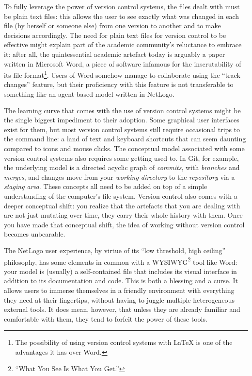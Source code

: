\documentclass[runningheads]{llncs}
\begin{document}
To fully leverage the power of version control systems, the files dealt with must be plain text files: this allows the user to see exactly what was changed in each file (by herself or someone else) from one version to another and to make decisions accordingly. The need for plain text files for version control to be effective might explain part of the academic community's reluctance to embrace it: after all, the quintessential academic artefact today is arguably a paper written in Microsoft Word, a piece of software infamous for the inscrutability of its file format\footnote{The possibility of using version control systems with \LaTeX{} is one of the advantages it has over Word.}. Users of Word somehow manage to collaborate using the ``track changes'' feature, but their proficiency with this feature is not transferable to something like an agent-based model written in NetLogo.

The learning curve that comes with the use of version control systems might be the single biggest impediment to their adoption. Some graphical user interfaces exist for them, but most version control systems still require occasional trips to the command line: a land of text and keyboard shortcuts that can seem daunting compared to icons and mouse clicks. The conceptual model associated with some version control systems also requires some getting used to. In Git, for example, the underlying model is a directed acyclic graph of \emph{commits}, with \emph{branches} and \emph{merges}, and changes move from your \emph{working directory} to the \emph{repository} via a \emph{staging area}. These concepts all need to be added on top of a simple understanding of the computer's file system. Version control also comes with a deeper conceptual shift: you realize that the artefacts that you are dealing with are not just mutating over time, they carry their whole history with them. Once you have made that conceptual shift, the idea of working without version control becomes unbearable.

The NetLogo user experience, by virtue of its ``low threshold, high ceiling'' philosophy, has some elements in common with a WYSIWYG\footnote{``What You See Is What You Get.''} tool like Word: your model is (usually) a self-contained file that includes its visual interface in addition to its documentation and code. This is both a blessing and a curse. It allows users to immerse themselves in a friendly environment with everything they need at their fingertips, without having to juggle multiple heterogeneous external tools. It does mean, however, that unless they are already familiar and comfortable with them, they tend to forfeit the power of these tools.
\end{document}
